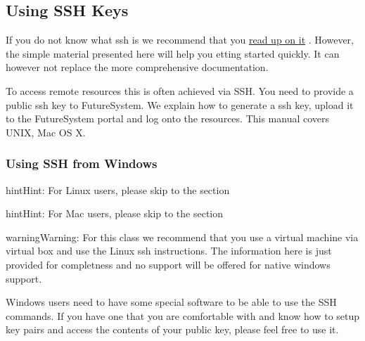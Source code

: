 \subsection{Using SSH Keys}
\label{\detokenize{lesson/linux/ssh:using-ssh-keys}}\label{\detokenize{lesson/linux/ssh::doc}}\label{\detokenize{lesson/linux/ssh:s-using-ssh}}
If you do not know what ssh is we recommend that you
\href{http://openssh.com/manual.html}{read up on it} .
However, the simple material presented here will help you
etting started quickly. It can however not replace the more
comprehensive documentation.

To access remote resources this is often achieved via SSH. You need to
provide a public ssh key to FutureSystem. We explain how to generate a
ssh key, upload it to the FutureSystem portal and log onto the
resources. This manual covers UNIX, Mac OS X.


\subsubsection{Using SSH from Windows}
\label{\detokenize{lesson/linux/ssh:s-using-ssh-windows}}\label{\detokenize{lesson/linux/ssh:using-ssh-from-windows}}
\begin{sphinxadmonition}{hint}{Hint:}
For Linux users, please skip to the section {\hyperref[\detokenize{lesson/linux/ssh:s-ssh-generate}]{}}
\end{sphinxadmonition}

\begin{sphinxadmonition}{hint}{Hint:}
For Mac users, please skip to the section {\hyperref[\detokenize{lesson/linux/ssh:s-ssh-osx}]{}}
\end{sphinxadmonition}

\begin{sphinxadmonition}{warning}{Warning:}
For this class we recommend that you use a virtual
machine via virtual box and use the Linux ssh
instructions. The information here is just provided for
completness and no support will be offered for native
windows support.
\end{sphinxadmonition}

Windows users need to have some special software to be able to use the
SSH commands. If you have one that you are comfortable with and know
how to setup key pairs and access the contents of your public key,
please feel free to use it.

